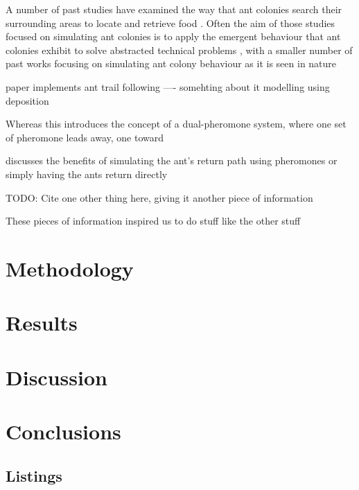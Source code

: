\documentclass{article}
\begin{document}
		A number of past studies have examined the way that ant colonies search their surrounding areas to locate and retrieve food \cite{vittori_modeling_2004, 1}.
		Often the aim of those studies focused on simulating ant colonies is to apply the emergent behaviour that ant colonies exhibit to solve abstracted technical
		problems \cite{2, 3}, with a smaller number of past works focusing on simulating ant colony behaviour as it is seen in nature \cite{4} %
		
		\cite{4} paper implements ant trail following  ---- somehting about it modelling using deposition
		
		Whereas this \cite{1} introduces the concept of a dual-pheromone system, where one set of pheromone leads away, one toward
		
		\cite{5} discusses the benefits of simulating the ant's return path using pheromones or simply having the ants return directly

		TODO: Cite one other thing here, giving it another piece of information

		These pieces of information inspired us to do stuff like the other stuff

  \section{Methodology}

  \section{Results}

  \section{Discussion}

  \section{Conclusions}

  \newpage
  
  

  \newpage
  \begin{appendix}
    \listoffigures
    \listoftables
    \section*{Listings}
  \end{appendix}
  
\end{document}
